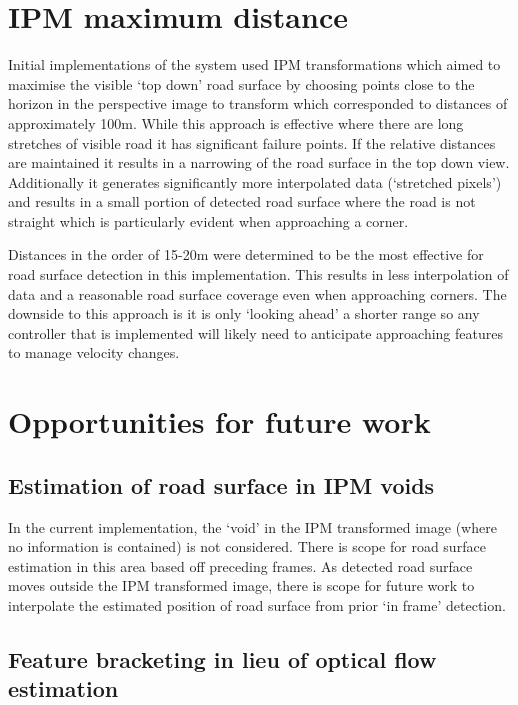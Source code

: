 \documentclass{article}
\begin{document}
\section{IPM maximum distance}\label{s:ipmMaxDist}

Initial implementations of the system used IPM transformations which aimed to maximise the visible `top down' road surface by choosing points close to the horizon in the perspective image to transform which corresponded to distances of approximately 100m. While this approach is effective where there are long stretches of visible road it has significant failure points. If the relative distances are maintained it results in a narrowing of the road surface in the top down view. Additionally it generates significantly more interpolated data (`stretched pixels') and results in a small portion of detected road surface where the road is not straight which is particularly evident when approaching a corner. 

Distances in the order of 15-20m were determined to be the most effective for road surface detection in this implementation. This results in less interpolation of data and a reasonable road surface coverage even when approaching corners. The downside to this approach is it is only `looking ahead' a shorter range so any controller that is implemented will likely need to anticipate approaching features to manage velocity changes. 

\section{Opportunities for future work} \label{s:improvements}

\subsection{Estimation of road surface in IPM voids}

In the current implementation, the `void' in the IPM transformed image (where no information is contained) is not considered. There is scope for road surface estimation in this area based off preceding frames. As detected road surface moves outside the IPM transformed image, there is scope for future work to interpolate the estimated position of road surface from prior `in frame' detection.

\subsection{Feature bracketing in lieu of optical flow estimation}
\end{document}
